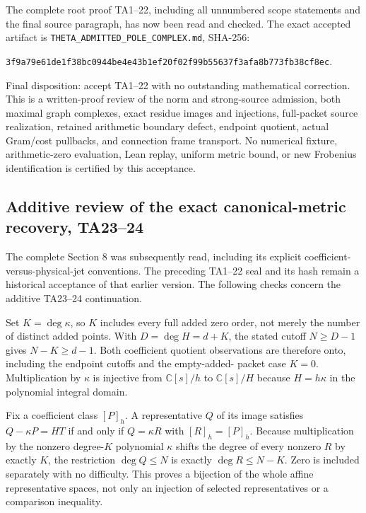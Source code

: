 The complete root proof TA1--22, including all unnumbered scope statements
and the final source paragraph, has now been read and checked. The exact
accepted artifact is \texttt{THETA\_\allowbreak{}ADMITTED\_\allowbreak{}POLE\_\allowbreak{}COMPLEX.md}, SHA-256:


{\small\texttt{3f9a79e6\allowbreak{}1de1f38b\allowbreak{}c0944be4\allowbreak{}e43b1ef2\allowbreak{}0f02f99b\allowbreak{}55637f3a\allowbreak{}fa8b773f\allowbreak{}b38cf8ec}}.


Final disposition: accept TA1--22 with no outstanding mathematical
correction. This is a written-proof review of the norm and strong-source
admission, both maximal graph complexes, exact residue images and
injections, full-packet source realization, retained arithmetic boundary
defect, endpoint quotient, actual Gram/cost pullbacks, and connection
frame transport. No numerical fixture, arithmetic-zero evaluation,
Lean replay, uniform metric bound, or new Frobenius identification is
certified by this acceptance.


\subsection*{Additive review of the exact canonical-metric recovery, TA23--24}


The complete Section 8 was subsequently read, including its explicit
coefficient-versus-physical-jet conventions. The preceding TA1--22 seal
and its hash remain a historical acceptance of that earlier version.
The following checks concern the additive TA23--24 continuation.


Set \(K=\deg\kappa\), so \(K\) includes every full added zero order, not merely
the number of distinct added points. With \(D=\deg H=d+K\), the stated
cutoff \(N\ge D-1\) gives \(N-K\ge d-1\). Both coefficient quotient observations
are therefore onto, including the endpoint cutoffs and the empty-added-
packet case \(K=0\). Multiplication by \(\kappa\) is injective from \(\mathbb C[s]/h\) to
\(\mathbb C[s]/H\) because \(H=h\kappa\) in the polynomial integral domain.


Fix a coefficient class \([P]_h\). A representative \(Q\) of its image satisfies
\(Q-\kappa P=HT\) if and only if \(Q=\kappa R\) with \([R]_h=[P]_h\).
Because multiplication by the nonzero degree-\(K\) polynomial \(\kappa\) shifts
the degree of every nonzero \(R\) by exactly \(K\), the restriction \(\deg Q\le N\)
is exactly \(\deg R\le N-K\). Zero is included separately with no difficulty.
This proves a bijection of the whole affine representative spaces, not
only an injection of selected representatives or a comparison inequality.



